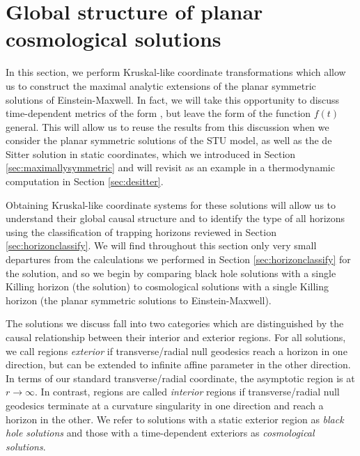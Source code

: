 \section{Global structure of planar cosmological solutions}
\label{sec:pemglobal}

In this section, we perform Kruskal-like coordinate transformations which allow us to construct the maximal analytic extensions of the planar symmetric solutions of Einstein-Maxwell. In fact, we will take this opportunity to discuss time-dependent metrics of the form , but leave the form of the function $f(t)$ general. This will allow us to reuse the results from this discussion when we consider the planar symmetric solutions of the STU model, as well as the de Sitter solution in static coordinates, which we introduced in Section \ref{sec:maximallysymmetric} and will revisit as an example in a thermodynamic computation in Section \ref{sec:desitter}.

Obtaining Kruskal-like coordinate systems for these solutions will allow us to understand their global causal structure and to identify the type of all horizons using the classification of trapping horizons reviewed in Section \ref{sec:horizonclassify}. We will find throughout this section only very small departures from the calculations we performed in Section \ref{sec:horizonclassify} for the \sch solution, and so we begin by comparing black hole solutions with a single Killing horizon (\eg the \sch solution) to cosmological solutions with a single Killing horizon (\eg the planar symmetric solutions to Einstein-Maxwell).

The solutions we discuss fall into two categories which are distinguished by the causal relationship between their interior and exterior regions. For all solutions, we call regions {\em exterior} if transverse/radial null geodesics reach a horizon in one direction, but can be extended to infinite affine parameter in the other direction. In terms of our standard transverse/radial coordinate, the asymptotic region is at $r \rightarrow \infty$. In contrast, regions are called {\em interior} regions if transverse/radial null geodesics terminate at a curvature singularity in one direction and reach a horizon in the other. We refer to solutions with a static exterior region as \emph{black hole solutions} and those with a time-dependent exteriors as \emph{cosmological solutions}.  

